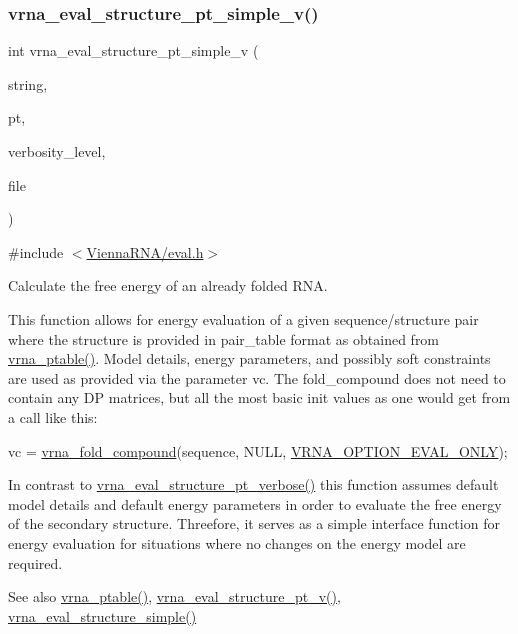 \subsubsection{\texorpdfstring{vrna\+\_\+eval\+\_\+structure\+\_\+pt\+\_\+simple\+\_\+v()}{vrna\_eval\_structure\_pt\_simple\_v()}}
{\footnotesize\ttfamily int vrna\+\_\+eval\+\_\+structure\+\_\+pt\+\_\+simple\+\_\+v (\begin{DoxyParamCaption}\item[{const char $\ast$}]{string,  }\item[{const short $\ast$}]{pt,  }\item[{int}]{verbosity\+\_\+level,  }\item[{F\+I\+LE $\ast$}]{file }\end{DoxyParamCaption})}



{\ttfamily \#include $<$\hyperlink{eval_8h}{Vienna\+R\+N\+A/eval.\+h}$>$}



Calculate the free energy of an already folded R\+NA. 

This function allows for energy evaluation of a given sequence/structure pair where the structure is provided in pair\+\_\+table format as obtained from \hyperlink{group__struct__utils__pair__table_gae829fb8bb7f694c12a9c0bbc34c77c60}{vrna\+\_\+ptable()}. Model details, energy parameters, and possibly soft constraints are used as provided via the parameter \textquotesingle{}vc\textquotesingle{}. The fold\+\_\+compound does not need to contain any DP matrices, but all the most basic init values as one would get from a call like this\+: 
\begin{DoxyCode}
vc = \hyperlink{group__fold__compound_ga6601d994ba32b11511b36f68b08403be}{vrna\_fold\_compound}(sequence, NULL, \hyperlink{group__fold__compound_ga61469c423131552c8483229f8b6c7e0e}{VRNA\_OPTION\_EVAL\_ONLY});
\end{DoxyCode}
 In contrast to \hyperlink{group__eval_ga8a517cfeeae8c376ae7b1e0c401d38b4}{vrna\+\_\+eval\+\_\+structure\+\_\+pt\+\_\+verbose()} this function assumes default model details and default energy parameters in order to evaluate the free energy of the secondary structure. Threefore, it serves as a simple interface function for energy evaluation for situations where no changes on the energy model are required.

\begin{DoxySeeAlso}{See also}
\hyperlink{group__struct__utils__pair__table_gae829fb8bb7f694c12a9c0bbc34c77c60}{vrna\+\_\+ptable()}, \hyperlink{group__eval_ga2c6533ba0afe4c88d335d8f1e0e2a48e}{vrna\+\_\+eval\+\_\+structure\+\_\+pt\+\_\+v()}, \hyperlink{group__eval_ga7e5273464b775d4130245681312c1369}{vrna\+\_\+eval\+\_\+structure\+\_\+simple()}
\end{DoxySeeAlso}

